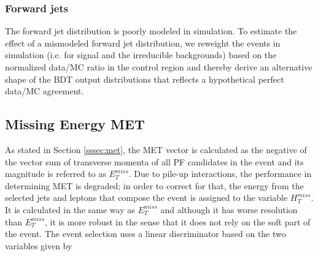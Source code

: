 \subsubsection*{Forward jets}





















The forward jet \etac distribution is poorly modeled in simulation. To estimate
the effect of a mismodeled forward jet distribution, we reweight the events in simulation (i.e.
for signal and the irreducible backgrounds) based on the normalized data/MC ratio in the
control region and thereby derive an alternative shape of the BDT output distributions that
reflects a hypothetical perfect data/MC agreement.








































\subsection{Missing Energy MET}

As stated in Section \ref{sssec:met}, the MET vector is calculated as the negative of the vector sum of transverse momenta of all PF candidates in the event and its magnitude is referred to as $E_T^{miss}$. Due to pile-up interactions, the performance in determining MET is degraded; in order to correct for that, the energy from the selected jets and leptons that compose the event is assigned to the variable $H_T^{miss}$. It is calculated in the same way as  $E_T^{miss}$ and although it has worse resolution than $E_T^{miss}$, it is more robust in the sense that it does not rely on the soft part of the event. The event selection uses a linear discriminator based on the two variables given by 

